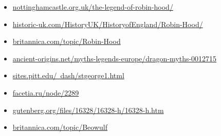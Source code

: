 \begin{itemize}
    \item \href{https://www.nottinghamcastle.org.uk/the-legend-of-robin-hood/}{nottinghamcastle.org.uk/the-legend-of-robin-hood/} \\
    \item \href{https://www.historic-uk.com/HistoryUK/HistoryofEngland/Robin-Hood/}{historic-uk.com/HistoryUK/HistoryofEngland/Robin-Hood/} \\
    \item \href{https://www.britannica.com/topic/Robin-Hood}{britannica.com/topic/Robin-Hood} \\
    \item \href{https://www.ancient-origins.net/myths-legends-europe/dragon-myths-0012715}{ancient-origins.net/myths-legends-europe/dragon-myths-0012715} \\
    \item \href{https://sites.pitt.edu/~dash/stgeorge1.html}{sites.pitt.edu/~dash/stgeorge1.html}
    \item \href{https://facetia.ru/node/2289}{facetia.ru/node/2289} \\
    \item \href{https://www.gutenberg.org/files/16328/16328-h/16328-h.htm}{gutenberg.org/files/16328/16328-h/16328-h.htm} \\
\item \href{https://www.britannica.com/topic/Beowulf}{britannica.com/topic/Beowulf}
\end{itemize}


